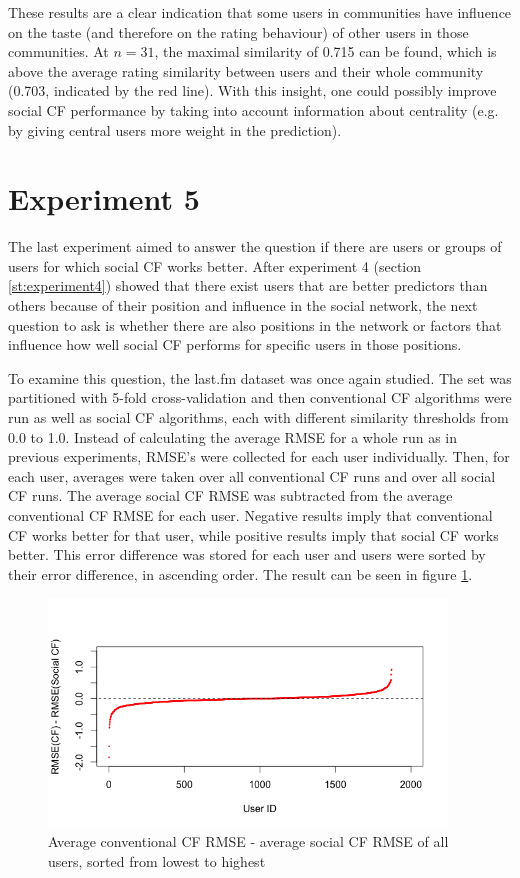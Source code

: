 These results are a clear indication that some users in communities have influence on the taste (and therefore on the rating behaviour) of other users in those communities. At $n=31$, the maximal similarity of 0.715 can be found, which is above the average rating similarity between users and their whole community (0.703, indicated by the red line). With this insight, one could possibly improve social CF performance by taking into account information about centrality (e.g. by giving central users more weight in the prediction).
\section{Experiment 5}
\label{st:experiment5} The last experiment aimed to answer the question if there are users or groups of users for which social CF works better. After experiment 4 (section \ref{st:experiment4}) showed that there exist users that are better predictors than others because of their position and influence in the social network, the next question to ask is whether there are also positions in the network or factors that influence how well social CF performs for specific users in those positions.
\newline

To examine this question, the last.fm dataset was once again studied. The set was partitioned with 5-fold cross-validation and then conventional CF algorithms were run as well as social CF algorithms, each with different similarity thresholds from 0.0 to 1.0. Instead of calculating the average RMSE for a whole run as in previous experiments, RMSE's were collected for each user individually. Then, for each user, averages were taken over all conventional CF runs and over all social CF runs. The average social CF RMSE was subtracted from the average conventional CF RMSE for each user. Negative results imply that conventional CF works better for that user, while positive results imply that social CF works better. This error difference was stored for each user and users were sorted by their error difference, in ascending order. The result can be seen in figure \ref{f:usererrors}.

\begin{figure}[!h]
\includegraphics[width=400px]{./4-experiments/figures/UserErrors.png}
\caption{Average conventional CF RMSE - average social CF RMSE of all users, sorted from lowest to highest}
\label{f:usererrors}
\end{figure}

